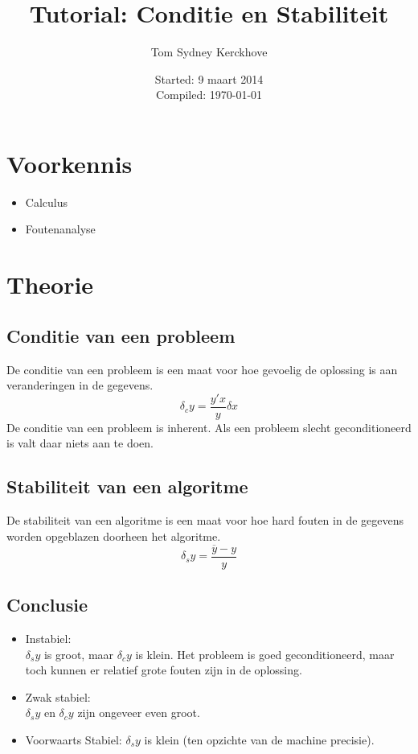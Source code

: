 \documentclass[10pt,a4paper]{article}
\author{Tom Sydney Kerckhove}
\title{Tutorial: Conditie en Stabiliteit}
\date{Started: 9 maart 2014\\Compiled: \today}
\begin{document}
\maketitle
\tableofcontents

\section{Voorkennis}
\begin{itemize}
\item Calculus
\item Foutenanalyse
\end{itemize}

\pagebreak

\section{Theorie}
\subsection{Conditie van een probleem}
De conditie van een probleem is een maat voor hoe gevoelig de oplossing is aan veranderingen in de gegevens.
\[
\delta_c y = \frac{y'x}{y}\delta x
\]
De conditie van een probleem is inherent. Als een probleem slecht geconditioneerd is valt daar niets aan te doen.

\subsection{Stabiliteit van een algoritme}
De stabiliteit van een algoritme is een maat voor hoe hard fouten in de gegevens worden opgeblazen doorheen het algoritme.
\[
\delta_s y = \frac{\overline{y}-y}{y}
\]

\subsection{Conclusie}
\begin{itemize}
\item Instabiel:\\
$\delta_s y$ is groot, maar $\delta_c y$ is klein. Het probleem is goed geconditioneerd, maar toch kunnen er relatief grote fouten zijn in de oplossing.
\item Zwak stabiel:\\
$\delta_s y$ en $\delta_c y$ zijn ongeveer even groot.
\item Voorwaarts Stabiel:
$\delta_s y$ is klein (ten opzichte van de machine precisie).
\end{itemize}
\end{document}
